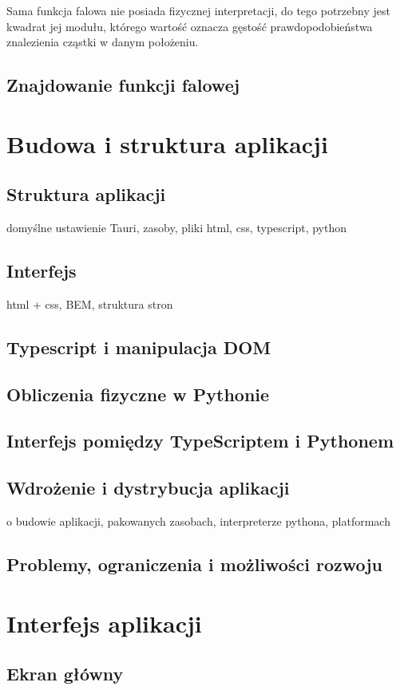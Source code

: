 \documentclass{SGGW-thesis}
\begin{document}
	Sama funkcja falowa nie posiada fizycznej interpretacji, do tego potrzebny jest kwadrat jej modułu, którego wartość oznacza gęstość prawdopodobieństwa znalezienia cząstki w danym położeniu.
	\section{Znajdowanie funkcji falowej}
	
\chapter{Budowa i struktura aplikacji}
	\section{Struktura aplikacji}
	domyślne ustawienie Tauri, zasoby, pliki html, css, typescript, python
	\section{Interfejs}
	html + css, BEM, struktura stron
	\section{Typescript i manipulacja DOM}
	\section{Obliczenia fizyczne w Pythonie}
	\section{Interfejs pomiędzy TypeScriptem i Pythonem}
	\section{Wdrożenie i dystrybucja aplikacji}
	o budowie aplikacji, pakowanych zasobach, interpreterze pythona, platformach
	\section{Problemy, ograniczenia i możliwości rozwoju}

\chapter{Interfejs aplikacji}
	\section{Ekran główny}
\end{document}
